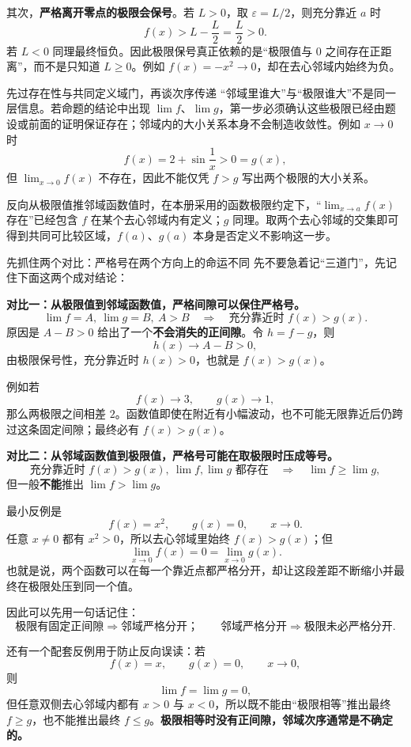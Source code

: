 \documentclass[11pt,a4paper]{ctexart}
\newcommand{\kw}[1]{\textbf{\color{deep}#1}}
\begin{document}
其次，\kw{严格离开零点的极限会保号}。若 $L>0$，取 $\varepsilon=L/2$，则充分靠近 $a$ 时
\[
f(x)>L-\frac L2=\frac L2>0.
\]
若 $L<0$ 同理最终恒负。因此极限保号真正依赖的是“极限值与 $0$ 之间存在正距离”，而不是只知道 $L\ge0$。例如 $f(x)=-x^2\to0$，却在去心邻域内始终为负。

\begin{warnbox}{先过存在性与共同定义域门，再谈次序传递}
“邻域里谁大”与“极限谁大”不是同一层信息。若命题的结论中出现 $\lim f$、$\lim g$，第一步必须确认这些极限已经由题设或前面的证明保证存在；邻域内的大小关系本身不会制造收敛性。例如 $x\to0$ 时
\[
f(x)=2+\sin\frac1x>0=g(x),
\]
但 $\lim_{x\to0}f(x)$ 不存在，因此不能仅凭 $f>g$ 写出两个极限的大小关系。

反向从极限值推邻域函数值时，在本册采用的函数极限约定下，“$\lim_{x\to a}f(x)$ 存在”已经包含 $f$ 在某个去心邻域内有定义；$g$ 同理。取两个去心邻域的交集即可得到共同可比较区域，$f(a)$、$g(a)$ 本身是否定义不影响这一步。
\end{warnbox}

\begin{corebox}{先抓住两个对比：严格号在两个方向上的命运不同}
先不要急着记“三道门”，先记住下面这两个成对结论：

\textbf{对比一：从极限值到邻域函数值，严格间隙可以保住严格号。}
\[
\boxed{\lim f=A,\ \lim g=B,\ A>B}
\quad\Longrightarrow\quad
\boxed{\text{充分靠近时 }f(x)>g(x)}.
\]
原因是 $A-B>0$ 给出了一个\kw{不会消失的正间隙}。令 $h=f-g$，则
\[
h(x)\to A-B>0,
\]
由极限保号性，充分靠近时 $h(x)>0$，也就是 $f(x)>g(x)$。

例如若
\[
f(x)\to3,\qquad g(x)\to1,
\]
那么两极限之间相差 $2$。函数值即使在附近有小幅波动，也不可能无限靠近后仍跨过这条固定间隙；最终必有 $f(x)>g(x)$。

\textbf{对比二：从邻域函数值到极限值，严格号可能在取极限时压成等号。}
\[
\boxed{\text{充分靠近时 }f(x)>g(x),\ \lim f,\lim g\text{ 都存在}}
\quad\Longrightarrow\quad
\boxed{\lim f\ge\lim g},
\]
但一般\textbf{不能}推出 $\lim f>\lim g$。

最小反例是
\[
f(x)=x^2,\qquad g(x)=0,\qquad x\to0.
\]
任意 $x\ne0$ 都有 $x^2>0$，所以去心邻域里始终 $f(x)>g(x)$；但
\[
\lim_{x\to0}f(x)=0=\lim_{x\to0}g(x).
\]
也就是说，两个函数可以在每一个靠近点都严格分开，却让这段差距不断缩小并最终在极限处压到同一个值。

因此可以先用一句话记住：
\[
\boxed{\text{极限有固定正间隙}\Rightarrow\text{邻域严格分开；}\qquad
\text{邻域严格分开}\Rightarrow\text{极限未必严格分开}.}
\]

还有一个配套反例用于防止反向误读：若
\[
f(x)=x,\qquad g(x)=0,\qquad x\to0,
\]
则
\[
\lim f=\lim g=0,
\]
但任意双侧去心邻域内都有 $x>0$ 与 $x<0$，所以既不能由“极限相等”推出最终 $f\ge g$，也不能推出最终 $f\le g$。\kw{极限相等时没有正间隙，邻域次序通常是不确定的。}
\end{corebox}
\end{document}
